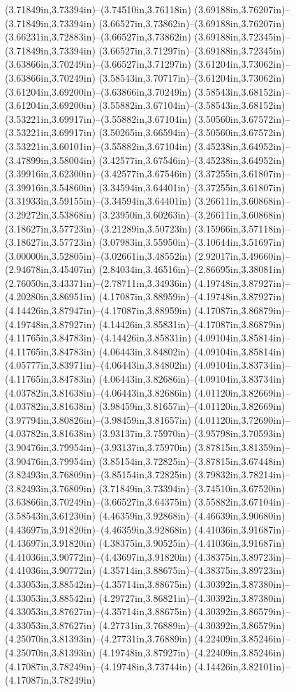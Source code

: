 (3.71849in,3.73394in)--(3.74510in,3.76118in) (3.69188in,3.76207in)--(3.71849in,3.73394in) (3.66527in,3.73862in)--(3.69188in,3.76207in) (3.66231in,3.72883in)--(3.66527in,3.73862in) (3.69188in,3.72345in)--(3.71849in,3.73394in) (3.66527in,3.71297in)--(3.69188in,3.72345in) (3.63866in,3.70249in)--(3.66527in,3.71297in) (3.61204in,3.73062in)--(3.63866in,3.70249in) (3.58543in,3.70717in)--(3.61204in,3.73062in) (3.61204in,3.69200in)--(3.63866in,3.70249in) (3.58543in,3.68152in)--(3.61204in,3.69200in) (3.55882in,3.67104in)--(3.58543in,3.68152in) (3.53221in,3.69917in)--(3.55882in,3.67104in) (3.50560in,3.67572in)--(3.53221in,3.69917in) (3.50265in,3.66594in)--(3.50560in,3.67572in) (3.53221in,3.60101in)--(3.55882in,3.67104in) (3.45238in,3.64952in)--(3.47899in,3.58004in) (3.42577in,3.67546in)--(3.45238in,3.64952in) (3.39916in,3.62300in)--(3.42577in,3.67546in) (3.37255in,3.61807in)--(3.39916in,3.54860in) (3.34594in,3.64401in)--(3.37255in,3.61807in) (3.31933in,3.59155in)--(3.34594in,3.64401in) (3.26611in,3.60868in)--(3.29272in,3.53868in) (3.23950in,3.60263in)--(3.26611in,3.60868in) (3.18627in,3.57723in)--(3.21289in,3.50723in) (3.15966in,3.57118in)--(3.18627in,3.57723in) (3.07983in,3.55950in)--(3.10644in,3.51697in) (3.00000in,3.52805in)--(3.02661in,3.48552in) (2.92017in,3.49660in)--(2.94678in,3.45407in) (2.84034in,3.46516in)--(2.86695in,3.38081in) (2.76050in,3.43371in)--(2.78711in,3.34936in) (4.19748in,3.87927in)--(4.20280in,3.86951in) (4.17087in,3.88959in)--(4.19748in,3.87927in) (4.14426in,3.87947in)--(4.17087in,3.88959in) (4.17087in,3.86879in)--(4.19748in,3.87927in) (4.14426in,3.85831in)--(4.17087in,3.86879in) (4.11765in,3.84783in)--(4.14426in,3.85831in) (4.09104in,3.85814in)--(4.11765in,3.84783in) (4.06443in,3.84802in)--(4.09104in,3.85814in) (4.05777in,3.83971in)--(4.06443in,3.84802in) (4.09104in,3.83734in)--(4.11765in,3.84783in) (4.06443in,3.82686in)--(4.09104in,3.83734in) (4.03782in,3.81638in)--(4.06443in,3.82686in) (4.01120in,3.82669in)--(4.03782in,3.81638in) (3.98459in,3.81657in)--(4.01120in,3.82669in) (3.97794in,3.80826in)--(3.98459in,3.81657in) (4.01120in,3.72690in)--(4.03782in,3.81638in) (3.93137in,3.75970in)--(3.95798in,3.70593in) (3.90476in,3.79954in)--(3.93137in,3.75970in) (3.87815in,3.81359in)--(3.90476in,3.79954in) (3.85154in,3.72825in)--(3.87815in,3.67448in) (3.82493in,3.76809in)--(3.85154in,3.72825in) (3.79832in,3.78214in)--(3.82493in,3.76809in) (3.71849in,3.73394in)--(3.74510in,3.67520in) (3.63866in,3.70249in)--(3.66527in,3.64375in) (3.55882in,3.67104in)--(3.58543in,3.61230in) (4.46359in,3.92868in)--(4.46639in,3.90680in) (4.43697in,3.91820in)--(4.46359in,3.92868in) (4.41036in,3.91687in)--(4.43697in,3.91820in) (4.38375in,3.90525in)--(4.41036in,3.91687in) (4.41036in,3.90772in)--(4.43697in,3.91820in) (4.38375in,3.89723in)--(4.41036in,3.90772in) (4.35714in,3.88675in)--(4.38375in,3.89723in) (4.33053in,3.88542in)--(4.35714in,3.88675in) (4.30392in,3.87380in)--(4.33053in,3.88542in) (4.29727in,3.86821in)--(4.30392in,3.87380in) (4.33053in,3.87627in)--(4.35714in,3.88675in) (4.30392in,3.86579in)--(4.33053in,3.87627in) (4.27731in,3.76889in)--(4.30392in,3.86579in) (4.25070in,3.81393in)--(4.27731in,3.76889in) (4.22409in,3.85246in)--(4.25070in,3.81393in) (4.19748in,3.87927in)--(4.22409in,3.85246in) (4.17087in,3.78249in)--(4.19748in,3.73744in) (4.14426in,3.82101in)--(4.17087in,3.78249in) 